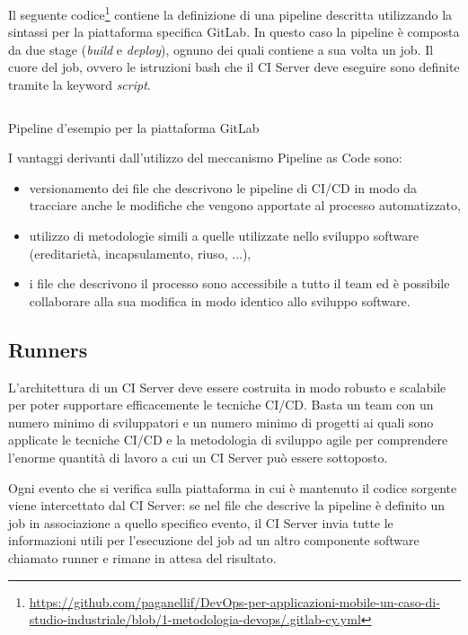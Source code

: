 Il seguente codice\footnote{\href{https://github.com/paganellif/DevOps-per-applicazioni-mobile-un-caso-di-studio-industriale/blob/1-metodologia-devops/.gitlab-cy.yml}{https://github.com/paganellif/DevOps-per-applicazioni-mobile-un-caso-di-studio-industriale/blob/1-metodologia-devops/.gitlab-cy.yml}} contiene la definizione di una pipeline descritta utilizzando la sintassi per la piattaforma specifica GitLab. In questo caso la pipeline è composta da due stage (\textit{build} e \textit{deploy}), ognuno dei quali contiene a sua volta un job. Il cuore del job, ovvero le istruzioni bash che il CI Server deve eseguire sono definite tramite la keyword \textit{script}.

\begin{listing}[H]
    \inputminted{yaml}{code/3-pipelineexample}
    \caption{Pipeline d'esempio per la piattaforma GitLab}
\end{listing}

I vantaggi derivanti dall'utilizzo del meccanismo Pipeline as Code sono:
\begin{itemize}
    \item versionamento dei file che descrivono le pipeline di CI/CD in modo da tracciare anche le modifiche che vengono apportate al processo automatizzato,
    \item utilizzo di metodologie simili a quelle utilizzate nello sviluppo software (ereditarietà, incapsulamento, riuso, ...),
    \item i file che descrivono il processo sono accessibile a tutto il team ed è possibile collaborare alla sua modifica in modo identico allo sviluppo software.
\end{itemize}

\subsection{Runners}
L'architettura di un CI Server deve essere costruita in modo robusto e scalabile per poter supportare efficacemente le tecniche CI/CD. Basta un team con un numero minimo di sviluppatori e un numero minimo di progetti ai quali sono applicate le tecniche CI/CD e la metodologia di sviluppo agile per comprendere l'enorme quantità di lavoro a cui un CI Server può essere sottoposto.

Ogni evento che si verifica sulla piattaforma in cui è mantenuto il codice sorgente viene intercettato dal CI Server: se nel file che descrive la pipeline è definito un job in associazione a quello specifico evento, il CI Server invia tutte le informazioni utili per l'esecuzione del job ad un altro componente software chiamato runner e rimane in attesa del risultato. 

